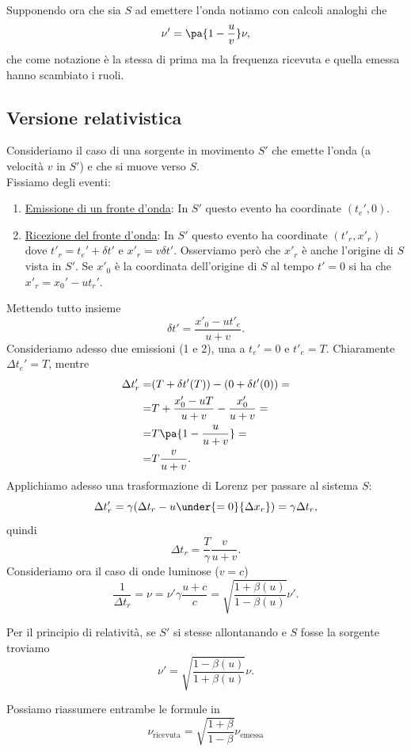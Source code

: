 \noindent Supponendo ora che sia $S$ ad emettere l'onda notiamo con calcoli analoghi che
\[\nu'=\pa{1-\frac uv}\nu,\]
che come notazione \`e la stessa di prima ma la frequenza ricevuta e quella emessa hanno scambiato i ruoli.

\subsection{Versione relativistica}
Consideriamo il caso di una sorgente in movimento $S'$ che emette l'onda (a velocit\`a $v$ in $S'$) e che si muove verso $S$.\\
Fissiamo degli eventi:
\begin{enumerate}
\item \ul{Emissione di un fronte d'onda}: In $S'$ questo evento ha coordinate $(t_e',0)$.
\item \ul{Ricezione del fronte d'onda}: In $S'$ questo evento ha coordinate $(t'_r,x'_r)$ dove $t'_r=t_e'+\delta t'$ e $x'_r=v\delta t'$. Osserviamo per\`o che $x'_r$ \`e anche l'origine di $S$ vista in $S'$. Se $x'_0$ \`e la coordinata dell'origine di $S$ al tempo $t'=0$ si ha che $x'_r=x_0'-ut_r'$.
\end{enumerate}
Mettendo tutto insieme
\[\delta t'=\frac{x'_0-ut'_e}{u+v}.\]
Consideriamo adesso due emissioni (1 e 2), una a $t_e'=0$ e $t'_e=T$. Chiaramente $\Delta t_e'=T$, mentre
\begin{align*}
\Delta t'_r=&(T+\delta t'(T)) - (0+\delta t'(0))=\\
=&T+\frac{x'_0-uT}{u+v}-\frac{x'_0}{u+v}=\\
=&T\pa{1-\frac u{u+v}}=\\
=&T\frac v{u+v}.
\end{align*}
Applichiamo adesso una trasformazione di Lorenz per passare al sistema $S$:
\[\Delta t'_r=\gamma(\Delta t_r-u\under{=0}{\Delta x_r})=\gamma \Delta t_r,\]
quindi
\[\Delta t_r=\frac T\gamma\frac v{u+v}.\]
Consideriamo ora il caso di onde luminose ($v=c$)
\[\frac1{\Delta t_r}=\nu=\nu'\gamma\frac{u+c}c=\sqrt{\frac{1+\beta(u)}{1-\beta(u)}}\nu'.\]
\bigskip

\noindent Per il principio di relativit\`a, se $S'$ si stesse allontanando e $S$ fosse la sorgente troviamo 
\[\nu'=\sqrt{\frac{1-\beta(u)}{1+\beta(u)}}\nu.\]

\bigskip

\noindent Possiamo riassumere entrambe le formule in
\[\boxed{\nu_{\mathrm{ricevuta}}=\sqrt{\frac{1+\beta}{1-\beta}}\nu_{\mathrm{emessa}}}\]



